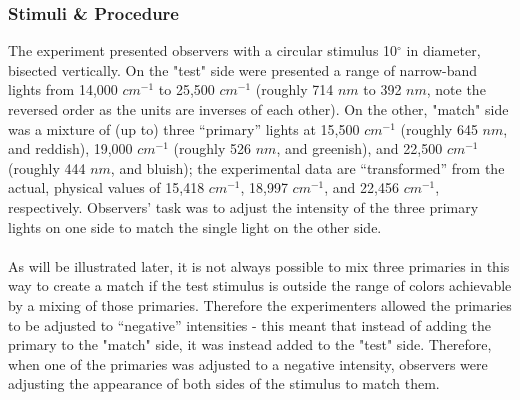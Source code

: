 \documentclass[twocolumn]{article}
\begin{document}
\subsubsection{Stimuli \& Procedure}
The experiment presented observers with a circular stimulus 10$^\circ$ in diameter, bisected vertically.  On the "test" side were presented a range of narrow-band lights from 14,000 $cm^{-1}$ to 25,500 $cm^{-1}$ (roughly 714 $nm$ to 392 $nm$, note the reversed order as the units are inverses of each other).  On the other, "match" side was a mixture of (up to) three “primary” lights at 15,500 $cm^{-1}$ (roughly 645 $nm$, and reddish), 19,000 $cm^{-1}$ (roughly 526 $nm$, and greenish), and 22,500 $cm^{-1}$ (roughly 444 $nm$, and bluish); the experimental data are “transformed” from the actual, physical values of 15,418 $cm^{-1}$, 18,997 $cm^{-1}$, and 22,456 $cm^{-1}$, respectively.  Observers’ task was to adjust the intensity of the three primary lights on one side to match the single light on the other side.\\ \\
As will be illustrated later, it is not always possible to mix three primaries in this way to create a match if the test stimulus is outside the range of colors achievable by a mixing of those primaries.  Therefore the experimenters allowed the primaries to be adjusted to “negative” intensities - this meant that instead of adding the primary to the "match" side, it was instead added to the "test" side.  Therefore, when one of the primaries was adjusted to a negative intensity, observers were adjusting the appearance of both sides of the stimulus to match them.
\end{document}
